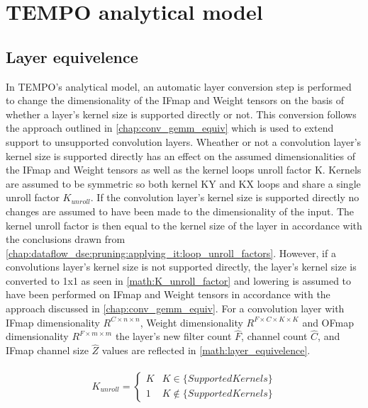 \section{TEMPO analytical model}
\label{chap:dataflow_dse:exploring:tempo_model}

\subsection{Layer equivelence}
\label{chap:dataflow_dse:exploring:tempo_model:layer_equivelence}

In TEMPO's analytical model, an automatic layer conversion step is performed to
change the dimensionality of the IFmap and Weight tensors on the basis of
whether a layer's kernel size is supported directly or not. This conversion
follows the approach outlined in \autoref{chap:conv_gemm_equiv} which is used to
extend support to unsupported convolution layers. Wheather or not a convolution
layer's kernel size is supported directly has an effect on the assumed
dimensionalities of the IFmap and Weight tensors as well as the kernel loops
unroll factor K. Kernels are assumed to be symmetric so both kernel KY and KX
loops and share a single unroll factor $K_{unroll}$. If the convolution layer's
kernel size is supported directly no changes are assumed to have been made to
the dimensionality of the input. The kernel unroll factor is then equal to the
kernel size of the layer in accordance with the conclusions drawn from
\autoref{chap:dataflow_dse:pruning:applying_it:loop_unroll_factors}. However, if
a convolutions layer's kernel size is not supported directly, the layer's kernel
size is converted to 1x1 as seen in \autoref{math:K_unroll_factor} and lowering
is assumed to have been performed on IFmap and Weight tensors in accordance with
the approach discussed in \autoref{chap:conv_gemm_equiv}. For a convolution
layer with IFmap dimensionality $R^{C\times n\times n}$, Weight dimensionality
$R^{F\times C\times K\times K}$ and OFmap dimensionality $R^{F\times m\times m}$
the layer's new filter count $\hat{F}$, channel count $\hat{C}$, and IFmap
channel size $\hat{Z}$ values are reflected in \autoref{math:layer_equivelence}. 

\begin{align}
    \begin{gathered}
        K_{unroll} = \begin{cases} K & K \in \{SupportedKernels\}\\1 &K \notin \{SupportedKernels\}\end{cases}
            \end{gathered}
    \label{math:K_unroll_factor}
\end{align}

